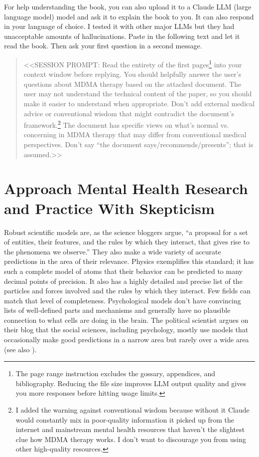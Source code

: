 \documentclass[11pt,oneside]{book}
\let\cite\parencite
\begin{document}
For help understanding the book, you can also upload it to a Claude LLM (large language model) model and ask it to explain the book to you. It can also respond in your language of choice. I tested it with other major LLMs but they had unacceptable amounts of hallucinations. Paste in the following text and let it read the book. Then ask your first question in a second message.
\begin{quotation}
    <<SESSION PROMPT: Read the entirety of the first  pages\footnote{The page range instruction excludes the gossary, appendices, and bibliography. Reducing the file size improves LLM output quality and gives you more responses before hitting usage limits.} into your context window before replying. You should helpfully answer the user's questions about MDMA therapy based on the attached document. The user may not understand the technical content of the paper, so you should make it easier to understand when appropriate. Don't add external medical advice or conventional wisdom that might contradict the document's framework.\footnote{I added the warning against conventional wisdom because without it Claude would constantly mix in poor-quality information it picked up from the internet and mainstream mental health resources that haven't the slightest clue how MDMA therapy works. I don't want to discourage you from using other high-quality resources.} The document has specific views on what's normal vs. concerning in MDMA therapy that may differ from conventional medical perspectives. Don't say \enquote{the document says/recommends/presents}; that is assumed.>>
\end{quotation}

\section{Approach Mental Health Research and Practice With Skepticism}
\label{howtoevaluate}
Robust scientific models are, as the science bloggers \textcite{mechanisticModels} argue, \enquote{a proposal for a set of entities, their features, and the rules by which they interact, that gives rise to the phenomena we observe.} They also make a wide variety of accurate predictions in the area of their relevance. Physics exemplifies this standard; it has such a complete model of atoms that their behavior can be predicted to many decimal points of precision. It also has a highly detailed and precise list of the particles and forces involved and the rules by which they interact. Few fields can match that level of completeness. Psychological models don't have convincing lists of well-defined parts and mechanisms and generally have no plausible connection to what cells are doing in the brain. The political scientist  argues on their blog that the social sciences, including psychology, mostly use models that occasionally make good predictions in a narrow area but rarely over a wide area~\cite{zombieSocialScience} (see also \textcite{evidenceBasedPolicy}).
\end{document}
